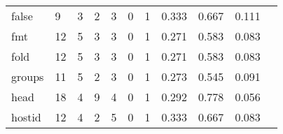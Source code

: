 \begin{longtable}{lp{1.2cm}p{1.2cm}p{1.2cm}p{1.2cm}p{1.2cm}p{1.2cm}p{1.2cm}p{1.2cm}p{1.2cm}p{1.2cm}}
false     &                                     9 &                                                  3 &                                                  2 &                                                  3 &                                                  0 &                                                  1 &                                              0.333 &                                              0.667 &                                              0.111 \\
fmt       &                                    12 &                                                  5 &                                                  3 &                                                  3 &                                                  0 &                                                  1 &                                              0.271 &                                              0.583 &                                              0.083 \\
fold      &                                    12 &                                                  5 &                                                  3 &                                                  3 &                                                  0 &                                                  1 &                                              0.271 &                                              0.583 &                                              0.083 \\
groups    &                                    11 &                                                  5 &                                                  2 &                                                  3 &                                                  0 &                                                  1 &                                              0.273 &                                              0.545 &                                              0.091 \\
head      &                                    18 &                                                  4 &                                                  9 &                                                  4 &                                                  0 &                                                  1 &                                              0.292 &                                              0.778 &                                              0.056 \\
hostid    &                                    12 &                                                  4 &                                                  2 &                                                  5 &                                                  0 &                                                  1 &                                              0.333 &                                              0.667 &                                              0.083 \\

\end{longtable}
